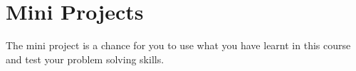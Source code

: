 \section{Mini Projects}
The mini project is a chance for you to use what you have learnt in this course and test your problem solving skills.






